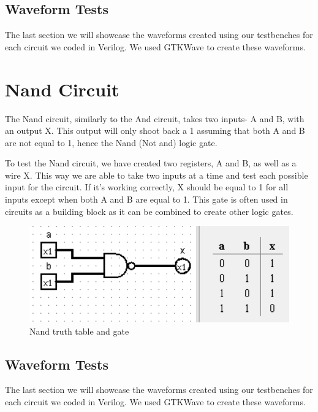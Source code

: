 \documentclass[12pt]{article}
\begin{document}
\subsection{Waveform Tests}

The last section we will showcase the waveforms created using our testbenches for each circuit we coded in Verilog. We used GTKWave to create these waveforms.

\newpage




\section{Nand Circuit}
The Nand circuit, similarly to the And circuit, takes two inputs- A and B, with an output X. This output will only shoot back a 1 assuming that both A and B are not equal to 1, hence the Nand (Not and) logic gate.


To test the Nand circuit, we have created two registers, A and B, as well as a wire X. This way we are able to take two inputs at a time and test each possible input for the circuit. If it's working correctly, X should be equal to 1 for all inputs except when both A and B are equal to 1. This gate is often used in circuits as a building block as it can be combined to create other logic gates.


\begin{figure}[h]
    \centering
    \includegraphics[width = 1.0\textwidth]{figs/Nand CircuitTruth.png}
    \caption{Nand truth table and gate}
    \label{fig:enter-label}
\end{figure}

\newpage

\subsection{Waveform Tests}

The last section we will showcase the waveforms created using our testbenches for each circuit we coded in Verilog. We used GTKWave to create these waveforms.
\end{document}
